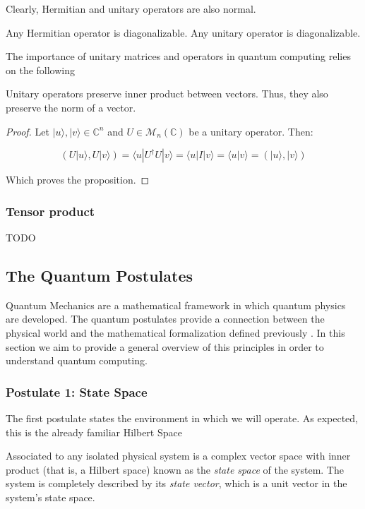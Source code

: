 Clearly, Hermitian and unitary operators are also normal.

\begin{corollary}
	Any Hermitian operator is diagonalizable. Any unitary operator is diagonalizable.
\end{corollary}

The importance of unitary matrices and operators in quantum computing relies on the following

\begin{proposition}
	Unitary operators preserve inner product between vectors. Thus, they also preserve the norm of a vector.
\end{proposition}

\begin{proof}
	Let $|u\rangle, |v\rangle \in \mathds{C}^n$ and $U \in \mathcal{M}_n(\mathds{C})$ be a unitary operator. Then:
	
	$$ ( U|u\rangle, U|v\rangle) = \langle u|U^\dagger U|v\rangle = \langle u|I|v\rangle = \langle u|v\rangle = ( |u\rangle, |v\rangle) $$
	
	Which proves the proposition.
\end{proof}

\subsubsection{Tensor product}

TODO



\subsection{The Quantum Postulates}

Quantum Mechanics are a mathematical framework in which quantum physics are developed. The quantum postulates provide a connection between the physical world and the mathematical formalization defined previously \cite{Nielsen2002}. In this section we aim to provide a general overview of this principles in order to understand quantum computing.

\subsubsection{Postulate 1: State Space}

The first postulate states the environment in which we will operate. As expected, this is the already familiar Hilbert Space

\begin{postulate}
	Associated to any isolated physical system is a complex vector space with inner product (that is, a Hilbert space) known as the \emph{state space} of the system. The system is completely described by its \emph{state vector}, which is a unit vector in the system’s state space.
\end{postulate}

